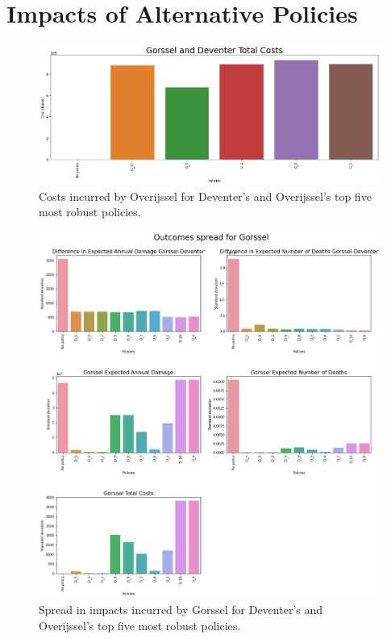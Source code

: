 \section{Impacts of Alternative Policies}
\label{a:impacts_policies}

\begin{figure}[h!]
    \centering
    \includegraphics[width=\textwidth]{report/figures/results/spreads/cost_policies_Overijssel.png}
    \caption{Costs incurred by Overijssel for Deventer's and Overijssel's top five most robust policies.}
    \label{fig:cost-pol-o}
\end{figure}

\begin{figure}[h!]
    \centering
    \includegraphics[width=\textwidth]{report/figures/results/spreads/outcome_spreads_Gorssel.png}
    \caption{Spread in impacts incurred by Gorssel for Deventer's and Overijssel's top five most robust policies.}
    \label{fig:impacts_gorss}
\end{figure}

